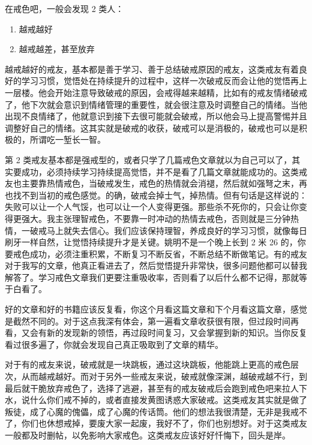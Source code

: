 \documentclass{ctexart}
\begin{document}
在戒色吧，一般会发现 2 类人：

\begin{multicols}{2}
    \begin{enumerate}
        \item 越戒越好
        \item 越戒越差，甚至放弃
    \end{enumerate}
\end{multicols}

越戒越好的戒友，基本都是善于学习、善于总结破戒原因的戒友，这类戒友有着良好的学习习惯，觉悟处在持续提升的过程中，这样一次破戒反而会让他的觉悟再上一层楼。他会开始注意导致破戒的原因，会戒得越来越精，比如有的戒友情绪破戒了，他下次就会意识到情绪管理的重要性，就会很注意及时调整自己的情绪。当他出现不良情绪了，他就意识到接下去很可能就会破戒，所以他会马上提高警惕并且调整好自己的情绪。这其实就是破戒的收获，破戒可以是消极的，破戒也可以是积极的，所谓吃一堑长一智。

第 2 类戒友基本都是强戒型的，或者只学了几篇戒色文章就以为自己可以了，其实要成功，必须持续学习持续提高觉悟，并不是看了几篇文章就能成功的。这类戒友也主要靠热情戒色，当破戒发生，戒色的热情就会消褪，然后就如强弩之末，再也找不到当初的戒色感觉。的确，破戒会掉士气，掉热情。但有句话是这样说的：失败可以让一个人气馁，也可以让一个人变得更强。那些杀不死你的，只会让你变得更强大。我主张理智戒色，不要靠一时冲动的热情去戒色，否则就是三分钟热情，一破戒马上就失去信心。我们应该保持理智，养成良好的学习习惯，就像每日刷牙一样自然，让觉悟持续提升才是关键。姚明不是一个晚上长到 2 米 26 的，你要戒色成功，必须注重积累，不断复习不断反省，不断总结不断做笔记。有的戒友对于我写的文章，他真正看进去了，然后觉悟提升非常快，很多问题他都可以替我解答了。学习戒色文章我们更要注重吸收率，否则看了以后什么都不记得，那就等于白看了。

好的文章和好的书籍应该反复看，你这个月看这篇文章和下个月看这篇文章，感觉是截然不同的。对于这点我深有体会，第一遍看文章收获很有限，但过段时间再看，又会有新的发现新的领悟，再过段时间复习，又会掌握到新的知识。当你反复看过很多遍了，你就会发现自己真正吸取到了文章的精华。

对于有的戒友来说，破戒就是一块跳板，通过这块跳板，他能跳上更高的戒色层次，从而越戒越好。而对于另外一些戒友来说，破戒就像深渊，越破戒越不行，到最后就干脆放弃戒色了，选择了逃避，甚至有的戒友破戒后会跑到戒色吧来拉人下水，说什么你们戒不掉的，或者直接发黄图诱惑大家破戒。这类戒友其实就是做了叛徒，成了心魔的傀儡，成了心魔的传话筒。他们的想法我很清楚，无非是我戒不了，你们也休想戒掉，要废大家一起废，我好不了，你们也别想好。对于这类戒友一般都及时删帖，以免影响大家戒色。这类戒友应该好好忏悔下，回头是岸。
\end{document}
